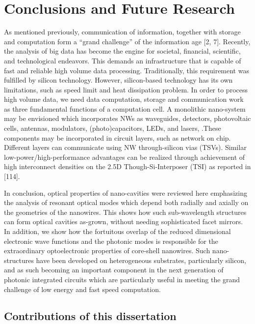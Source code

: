 \chapter{Conclusions and Future Research} \label{conclusions}

As mentioned previously, communication of information, together with storage
and computation form a “grand challenge” of the information age [2, 7].
Recently, the analysis of big data has become the engine for societal,
financial, scientific, and technological endeavors. This demands an
infrastructure that is capable of fast and reliable high volume data
processing. Traditionally, this requirement was fulfilled by silicon
technology. However, silicon-based technology has its own limitations, such as
speed limit and heat dissipation problem. In order to process high volume data,
we need data computation, storage and communication work as three fundamental
functions of a computation cell. A monolithic nano-system may be envisioned
which incorporates NWs as waveguides, detectors, photovoltaic cells, antennas,
modulators, (photo)capacitors, LEDs, and lasers, .These components may be
incorporated in circuit layers, such as network on chip. Different layers can
communicate using NW through-silicon vias (TSVs). Similar
low-power/high-performance advantages can be realized through achievement of
high interconnect densities on the 2.5D Though-Si-Interposer (TSI) as reported
in [114].

In conclusion, optical properties of nano-cavities were reviewed
here emphasizing the analysis of resonant optical modes which depend both
radially and axially on the geometries of the nanowires. This shows how such
sub-wavelength structures can form optical cavities as-grown, without needing
sophisticated facet mirrors. In addition, we show how the fortuitous overlap of
the reduced dimensional electronic wave functions and the photonic modes is
responsible for the extraordinary optoelectronic properties of core-shell
nanowires. Such nano-structures have been developed on heterogeneous
substrates, particularly silicon, and as such becoming an important component
in the next generation of photonic integrated circuits which are particularly
useful in meeting the grand challenge of low energy and fast speed computation.

\section{Contributions of this dissertation}

